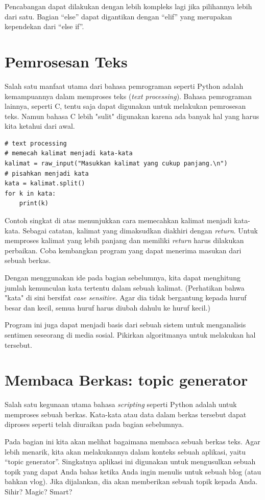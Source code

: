 Pencabangan dapat dilakukan dengan lebih kompleks lagi jika pilihannya
lebih dari satu. Bagian ``else'' dapat digantikan dengan ``elif''
yang merupakan kependekan dari ``else if''.



\section{Pemrosesan Teks}
Salah satu manfaat utama dari bahasa pemrograman seperti Python adalah
kemampuannya dalam memproses teks ({\em text processing}). Bahasa
pemrograman lainnya, seperti C, tentu saja dapat digunakan untuk melakukan
pemrosesan teks. Namun bahasa C lebih "sulit" digunakan karena ada banyak
hal yang harus kita ketahui dari awal.

\begin{verbatim}
# text processing
# memecah kalimat menjadi kata-kata
kalimat = raw_input("Masukkan kalimat yang cukup panjang.\n")
# pisahkan menjadi kata
kata = kalimat.split()
for k in kata:
    print(k)
\end{verbatim}

Contoh singkat di atas menunjukkan cara memecahkan kalimat menjadi kata-kata.
Sebagai catatan, kalimat yang dimaksudkan diakhiri dengan {\em return}. 
Untuk memproses kalimat yang lebih panjang dan memiliki {\em return} harus 
dilakukan perbaikan.
Coba kembangkan program yang dapat menerima masukan dari sebuah berkas.

Dengan menggunakan ide pada bagian sebelumnya, kita dapat menghitung
jumlah kemunculan kata tertentu dalam sebuah kalimat. (Perhatikan bahwa
"kata" di sini bersifat {\em case sensitive}. Agar dia tidak bergantung
kepada huruf besar dan kecil, semua huruf harus diubah dahulu ke
huruf kecil.)

Program ini juga dapat menjadi basis dari sebuah sistem untuk menganalisis
sentimen seseorang di media sosial. Pikirkan algoritmanya untuk melakukan
hal tersebut.


\section{Membaca Berkas: topic generator}
Salah satu kegunaan utama bahasa {\em scripting} seperti Python adalah
untuk memproses sebuah berkas. Kata-kata atau data dalam berkas tersebut
dapat diproses seperti telah diuraikan pada bagian sebelumnya.

Pada bagian ini kita akan melihat bagaimana membaca sebuah berkas teks.
Agar lebih menarik, kita akan melakukannya dalam konteks sebuah aplikasi,
yaitu ``topic generator''. Singkatnya aplikasi ini digunakan untuk
mengusulkan sebuah topik yang dapat Anda bahas ketika Anda ingin
menulis untuk sebuah blog (atau bahkan vlog).
Jika dijalankan, dia akan memberikan sebuah topik kepada Anda.
Sihir? Magic? Smart?


